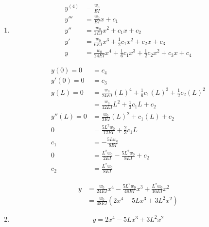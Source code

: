 \documentclass{article}
\begin{document}
\begin{enumerate}
  \item

        \begin{align*}
          y^{(4)} & = \frac{w_0}{E I}                                                                  \\
          y'''    & = \frac{w_0}{E I} x + c_1                                                          \\
          y''     & = \frac{w_0}{2 E I} x^2 + c_1 x + c_2                                              \\
          y'      & = \frac{w_0}{6 E I} x^3 + \frac{1}{2} c_1 x^2 + c_2 x + c_3                        \\
          y       & = \frac{w_0}{24 E I} x^4 + \frac{1}{6} c_1 x^3 + \frac{1}{2} c_2 x^2 + c_3 x + c_4
        \end{align*}

        \begin{align*}
          y(0) = 0   & = c_4                                                                      \\
          y'(0) = 0  & = c_3                                                                      \\
          y(L) = 0   & = \frac{w_0}{24 E I} (L)^4 + \frac{1}{6} c_1 (L)^3 + \frac{1}{2} c_2 (L)^2 \\
                     & = \frac{w_0}{12 E I} L^2 + \frac{1}{3} c_1 L + c_2                         \\
          y''(L) = 0 & = \frac{w_0}{2 E I} (L)^2 + c_1 (L) + c_2                                  \\
          0          & = \frac{5 L^2 w_0}{12 E I} + \frac{2}{3} c_1 L                             \\
          c_1        & = -\frac{5 L w_0}{8 E I}                                                   \\
          0          & = \frac{L^2 w_0}{2 E I} - \frac{5 L^2 w_0}{8 E I} + c_2                    \\
          c_2        & = \frac{L^2 w_0}{8 E I}
        \end{align*}

        \begin{align*}
          y & = \frac{w_0}{24 E I} x^4 - \frac{5 L^2 w_0}{48 E I} x^3 + \frac{L^2 w_0}{16 E I} x^2 \\
            & = \frac{w_0}{48 E I} (2 x^4 - 5 L x^3 + 3 L^2 x^2)
        \end{align*}

  \item \[y = 2 x^4 - 5 L x^3 + 3 L^2 x^2\]
\end{enumerate}
\end{document}
